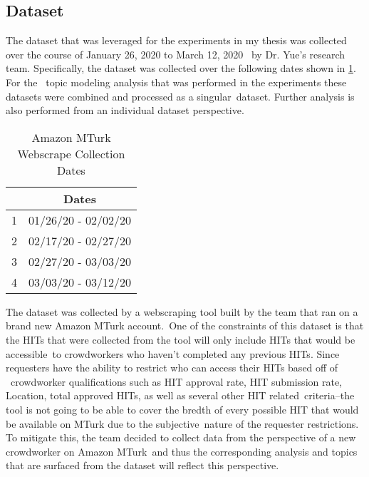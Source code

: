 \documentclass[letterpaper,12pt]{article}
\begin{document}
\subsection{Dataset}
The dataset that was leveraged for the experiments in my thesis was collected over the course of January 26, 2020 to March 12, 2020 \
by Dr. Yue's research team. Specifically, the dataset was collected over the following dates shown in \ref{tab:data_dates}. For the \
topic modeling analysis that was performed in the experiments these datasets were combined and processed as a singular\
dataset. Further analysis is also performed from an individual dataset perspective.
\begin{table}
	\caption{\label{tab:data_dates} Amazon MTurk Webscrape Collection Dates}
	\begin{center}
		\begin{tabular}{|c|c|}
			\hline
			& Dates \\
			\hline
			1 & 01/26/20 - 02/02/20 \\
			\hline
			2 & 02/17/20 - 02/27/20 \\
			\hline
			3 & 02/27/20 - 03/03/20 \\
			\hline
			4 & 03/03/20 - 03/12/20 \\
			\hline
		\end{tabular}
	\end{center}
\end{table}
The dataset was collected by a webscraping tool built by the team that ran on a brand new Amazon MTurk account.\
One of the constraints of this dataset is that the HITs that were collected from the tool will only include HITs that would be accessible\
to crowdworkers who haven't completed any previous HITs. Since requesters have the ability to restrict who can access their HITs based off of \
crowdworker qualifications such as HIT approval rate, HIT submission rate, Location, total approved HITs, as well as several other HIT related\
criteria--the tool is not going to be able to cover the bredth of every possible HIT that would be available on MTurk due to the subjective\
nature of the requester restrictions. To mitigate this, the team decided to collect data from the perspective of a new crowdworker on Amazon MTurk\
and thus the corresponding analysis and topics that are surfaced from the dataset will reflect this perspective.
\end{document}

